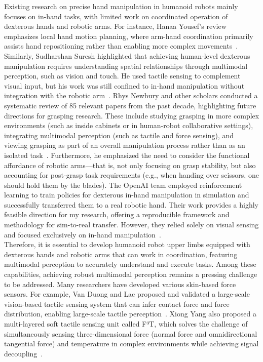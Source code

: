 \documentclass[11pt,a4paper]{article}
\begin{document}
Existing research on precise hand manipulation in humanoid robots mainly focuses on in-hand tasks, with limited work on coordinated operation of dexterous hands and robotic arms. For instance, Hanaa Yousef's review emphasizes local hand motion planning, where arm-hand coordination primarily assists hand repositioning rather than enabling more complex movements~\cite{yousef2011tactile}. Similarly, Sudharshan Suresh highlighted that achieving human-level dexterous manipulation requires understanding spatial relationships through multimodal perception, such as vision and touch. He used tactile sensing to complement visual input, but his work was still confined to in-hand manipulation without integration with the robotic arm~\cite{suresh2024neuralfeels}. Rhys Newbury and other scholars conducted a systematic review of 85 relevant papers from the past decade, highlighting future directions for grasping research. These include studying grasping in more complex environments (such as inside cabinets or in human-robot collaborative settings), integrating multimodal perception (such as tactile and force sensing), and viewing grasping as part of an overall manipulation process rather than as an isolated task~\cite{newbury2023deep}. Furthermore, he emphasized the need to consider the functional affordance of robotic arms—that is, not only focusing on grasp stability, but also accounting for post-grasp task requirements (e.g., when handing over scissors, one should hold them by the blades). The OpenAI team employed reinforcement learning to train policies for dexterous in-hand manipulation in simulation and successfully transferred them to a real robotic hand. Their work provides a highly feasible direction for my research, offering a reproducible framework and methodology for sim-to-real transfer. However, they relied solely on visual sensing and focused exclusively on in-hand manipulation~\cite{andrychowicz2020learning}.\\
Therefore, it is essential to develop humanoid robot upper limbs equipped with dexterous hands and robotic arms that can work in coordination, featuring multimodal perception to accurately understand and execute tasks. Among these capabilities, achieving robust multimodal perception remains a pressing challenge to be addressed. Many researchers have developed various skin-based force sensors. For example, Van Duong and Lac proposed and validated a large-scale vision-based tactile sensing system that can infer contact force and force distribution, enabling large-scale tactile perception~\cite{van2020large}. Xiong Yang also proposed a multi-layered soft tactile sensing unit called F³T, which solves the challenge of simultaneously sensing three-dimensional force (normal force and omnidirectional tangential force) and temperature in complex environments while achieving signal decoupling~\cite{YANG2025}.\\
\end{document}
